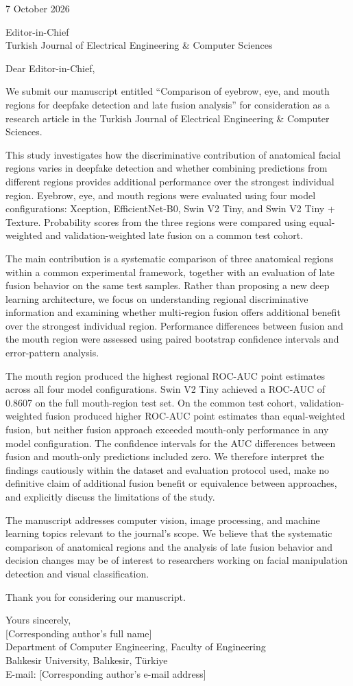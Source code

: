 \documentclass[11pt,a4paper]{article}
\begin{document}
7 October 2026

Editor-in-Chief\\Turkish Journal of Electrical Engineering \& Computer Sciences

Dear Editor-in-Chief,

We submit our manuscript entitled “Comparison of eyebrow, eye, and mouth regions for deepfake detection and late fusion analysis” for consideration as a research article in the Turkish Journal of Electrical Engineering \& Computer Sciences.

This study investigates how the discriminative contribution of anatomical facial regions varies in deepfake detection and whether combining predictions from different regions provides additional performance over the strongest individual region. Eyebrow, eye, and mouth regions were evaluated using four model configurations: Xception, EfficientNet-B0, Swin V2 Tiny, and Swin V2 Tiny + Texture. Probability scores from the three regions were compared using equal-weighted and validation-weighted late fusion on a common test cohort.

The main contribution is a systematic comparison of three anatomical regions within a common experimental framework, together with an evaluation of late fusion behavior on the same test samples. Rather than proposing a new deep learning architecture, we focus on understanding regional discriminative information and examining whether multi-region fusion offers additional benefit over the strongest individual region. Performance differences between fusion and the mouth region were assessed using paired bootstrap confidence intervals and error-pattern analysis.

The mouth region produced the highest regional ROC-AUC point estimates across all four model configurations. Swin V2 Tiny achieved a ROC-AUC of 0.8607 on the full mouth-region test set. On the common test cohort, validation-weighted fusion produced higher ROC-AUC point estimates than equal-weighted fusion, but neither fusion approach exceeded mouth-only performance in any model configuration. The confidence intervals for the AUC differences between fusion and mouth-only predictions included zero. We therefore interpret the findings cautiously within the dataset and evaluation protocol used, make no definitive claim of additional fusion benefit or equivalence between approaches, and explicitly discuss the limitations of the study.

The manuscript addresses computer vision, image processing, and machine learning topics relevant to the journal’s scope. We believe that the systematic comparison of anatomical regions and the analysis of late fusion behavior and decision changes may be of interest to researchers working on facial manipulation detection and visual classification.

Thank you for considering our manuscript.

Yours sincerely,\\{} [Corresponding author’s full name]\\{} Department of Computer Engineering, Faculty of Engineering\\{} Balıkesir University, Balıkesir, Türkiye\\{} E-mail: [Corresponding author’s e-mail address]
\end{document}
